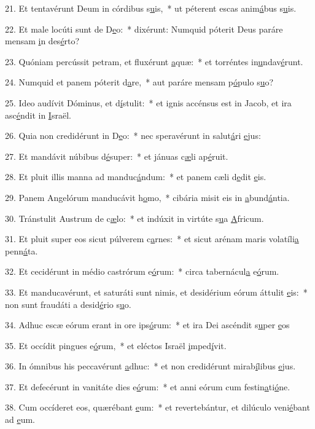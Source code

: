 21. Et tentavérunt Deum in córdibus s\uline{u}is,~* ut péterent escas anim\uline{á}bus s\uline{u}is.\par 
22. Et male locúti sunt de D\uline{e}o:~* dixérunt: Numquid póterit Deus paráre mensam \uline{i}n des\uline{é}rto?\par 
23. Quóniam percússit petram, et fluxérunt \uline{a}quæ:~* et torréntes in\uline{u}ndav\uline{é}runt.\par 
24. Numquid et panem póterit d\uline{a}re,~* aut paráre mensam p\uline{ó}pulo s\uline{u}o?\par 
25. Ideo audívit Dóminus, et d\uline{í}stulit:~* et ignis accénsus est in Jacob, et ira asc\uline{é}ndit in \uline{I}sraël.\par 
26. Quia non credidérunt in D\uline{e}o:~* nec speravérunt in salut\uline{á}ri \uline{e}jus:\par 
27. Et mandávit núbibus d\uline{é}super:~* et jánuas c\uline{æ}li ap\uline{é}ruit.\par 
28. Et pluit illis manna ad manduc\uline{á}ndum:~* et panem cæli d\uline{e}dit \uline{e}is.\par 
29. Panem Angelórum manducávit h\uline{o}mo,~* cibária misit eis in \uline{a}bund\uline{á}ntia.\par 
30. Tránstulit Austrum de c\uline{æ}lo:~* et indúxit in virtúte s\uline{u}a \uline{A}fricum.\par 
31. Et pluit super eos sicut púlverem c\uline{a}rnes:~* et sicut arénam maris volatíli\uline{a} penn\uline{á}ta.\par 
32. Et cecidérunt in médio castrórum e\uline{ó}rum:~* circa tabernácul\uline{a} e\uline{ó}rum.\par 
33. Et manducavérunt, et saturáti sunt nimis, et desidérium eórum áttulit \uline{e}is:~* non sunt fraudáti a desid\uline{é}rio s\uline{u}o.\par 
34. Adhuc escæ eórum erant in ore ips\uline{ó}rum:~* et ira Dei ascéndit s\uline{u}per \uline{e}os\par 
35. Et occídit pingues e\uline{ó}rum,~* et eléctos Israël \uline{i}mped\uline{í}vit.\par 
36. In ómnibus his peccavérunt \uline{a}dhuc:~* et non credidérunt mirab\uline{í}libus \uline{e}jus.\par 
37. Et defecérunt in vanitáte dies e\uline{ó}rum:~* et anni eórum cum festin\uline{a}ti\uline{ó}ne.\par 
38. Cum occíderet eos, quærébant \uline{e}um:~* et revertebántur, et dilúculo veni\uline{é}bant ad \uline{e}um.\par 
